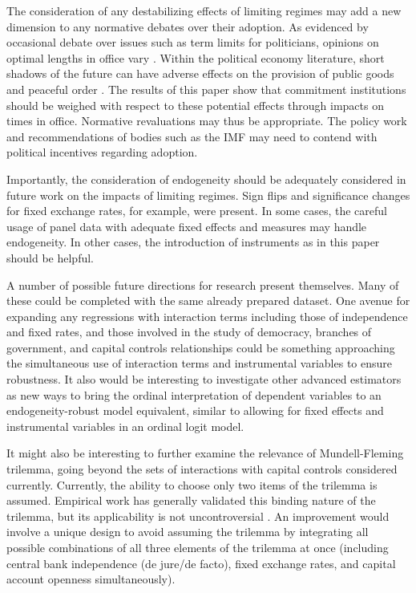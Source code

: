 \documentclass{article}
\begin{document}
    The consideration of any destabilizing effects of limiting regimes may add a new dimension to any normative debates over their adoption. As evidenced by occasional debate over issues such as term limits for politicians, opinions on optimal lengths in office vary \citep{greenberg_term_1994}. Within the political economy literature, short shadows of the future can have adverse effects on the provision of public goods and peaceful order \citep{olson_dictatorship_1993}. The results of this paper show that commitment institutions should be weighed with respect to these potential effects through impacts on times in office. Normative revaluations may thus be appropriate. The policy work and recommendations of bodies such as the IMF may need to contend with political incentives regarding adoption.

    Importantly, the consideration of endogeneity should be adequately considered in future work on the impacts of limiting regimes. Sign flips and significance changes for fixed exchange rates, for example, were present. In some cases, the careful usage of panel data with adequate fixed effects and measures may handle endogeneity. In other cases, the introduction of instruments as in this paper should be helpful.

    A number of possible future directions for research present themselves. Many of these could be completed with the same already prepared dataset. One avenue for expanding any regressions with interaction terms including those of independence and fixed rates, and those involved in the study of democracy, branches of government, and capital controls relationships could be something approaching the simultaneous use of interaction terms and instrumental variables to ensure robustness. It also would be interesting to investigate other advanced estimators as new ways to bring the ordinal interpretation of dependent variables to an endogeneity-robust model equivalent, similar to allowing for fixed effects and instrumental variables in an ordinal logit model.

    It might also be interesting to further examine the relevance of Mundell-Fleming trilemma, going beyond the sets of interactions with capital controls considered currently. Currently, the ability to choose only two items of the trilemma is assumed. Empirical work has generally validated this binding nature of the trilemma, but its applicability is not uncontroversial \citep{obstfeld_trilemma_2002}. An improvement would involve a unique design to avoid assuming the trilemma by integrating all possible combinations of all three elements of the trilemma at once (including central bank independence (de jure/de facto), fixed exchange rates, and capital account openness simultaneously).
\end{document}
